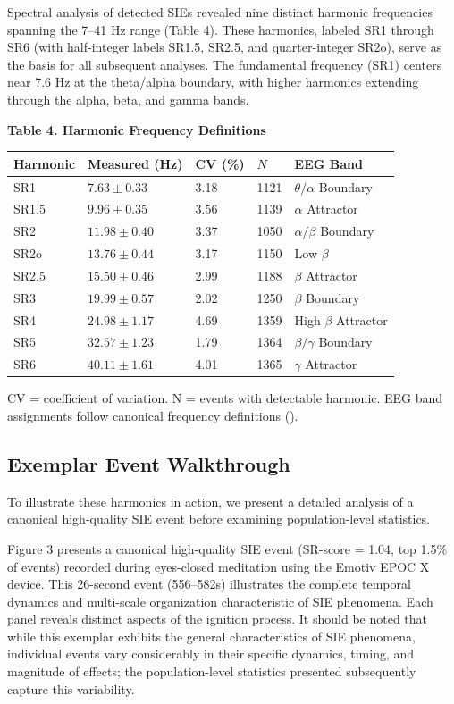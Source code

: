 \documentclass[11pt,a4paper]{article}
\begin{document}
Spectral analysis of detected SIEs revealed nine distinct harmonic frequencies spanning the 7–41 Hz range (Table 4). These harmonics, labeled SR1 through SR6 (with half-integer labels SR1.5, SR2.5, and quarter-integer SR2o), serve as the basis for all subsequent analyses. The fundamental frequency (SR1) centers near 7.6 Hz at the theta/alpha boundary, with higher harmonics extending through the alpha, beta, and gamma bands.

\textbf{Table 4. Harmonic Frequency Definitions}
\begin{table}[H]
    \centering
    \begin{tabular}{lllll}
        \toprule
        Harmonic & Measured (Hz) & CV (\%) & $N$ & EEG Band \\
        \midrule
        SR1 & $7.63 \pm 0.33$ & 3.18 & 1121 & $\theta/\alpha$ Boundary \\
        SR1.5 & $9.96 \pm 0.35$ & 3.56 & 1139 & $\alpha$ Attractor \\
        SR2 & $11.98 \pm 0.40$ & 3.37 & 1050 & $\alpha/\beta$ Boundary \\
        SR2o & $13.76 \pm 0.44$ & 3.17 & 1150 & Low $\beta$ \\
        SR2.5 & $15.50 \pm 0.46$ & 2.99 & 1188 & $\beta$ Attractor \\
        SR3 & $19.99 \pm 0.57$ & 2.02 & 1250 & $\beta$ Boundary \\
        SR4 & $24.98 \pm 1.17$ & 4.69 & 1359 & High $\beta$ Attractor \\
        SR5 & $32.57 \pm 1.23$ & 1.79 & 1364 & $\beta/\gamma$ Boundary \\
        SR6 & $40.11 \pm 1.61$ & 4.01 & 1365 & $\gamma$ Attractor \\
        \bottomrule
    \end{tabular}
\end{table}
CV = coefficient of variation. N = events with detectable harmonic. EEG band assignments follow canonical frequency definitions (\cite{buzsaki2004neuronal}).

\subsection{Exemplar Event Walkthrough}
To illustrate these harmonics in action, we present a detailed analysis of a canonical high-quality SIE event before examining population-level statistics.

Figure 3 presents a canonical high-quality SIE event (SR-score = 1.04, top 1.5\% of events) recorded during eyes-closed meditation using the Emotiv EPOC X device. This 26-second event (556–582s) illustrates the complete temporal dynamics and multi-scale organization characteristic of SIE phenomena. Each panel reveals distinct aspects of the ignition process. It should be noted that while this exemplar exhibits the general characteristics of SIE phenomena, individual events vary considerably in their specific dynamics, timing, and magnitude of effects; the population-level statistics presented subsequently capture this variability.
\end{document}
